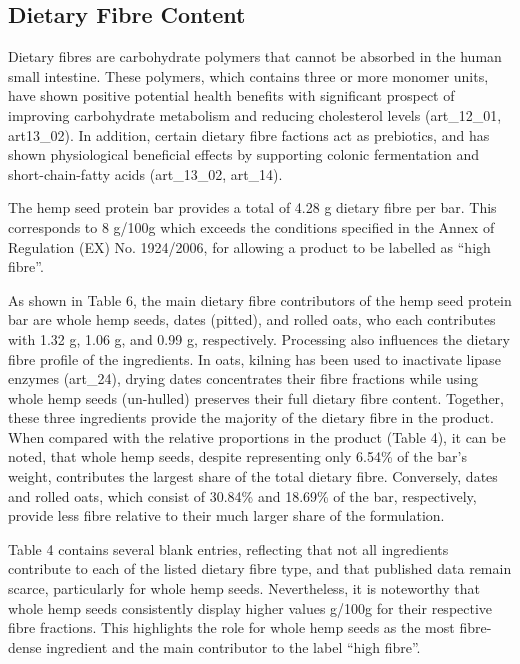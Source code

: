     
\subsection{Dietary Fibre Content} 
Dietary fibres are carbohydrate polymers that cannot be absorbed in the human small intestine. These polymers, which contains three or more monomer units, have shown positive potential health benefits with significant prospect of improving carbohydrate metabolism and reducing cholesterol levels (art\_12\_01, art13\_02). In addition, certain dietary fibre factions act as prebiotics, and has shown physiological beneficial effects by supporting colonic fermentation and short-chain-fatty acids (art\_13\_02, art\_14). 

\vspace{1em}
The hemp seed protein bar provides a total of 4.28 g dietary fibre per bar. This corresponds to 8 g/100g which exceeds the conditions specified in the Annex of Regulation (EX) No. 1924/2006, for allowing a product to be labelled as “high fibre”.

\vspace{1em}
As shown in Table 6, the main dietary fibre contributors of the hemp seed protein bar are whole hemp seeds, dates (pitted), and rolled oats, who each contributes with 1.32 g, 1.06 g, and 0.99 g, respectively. Processing also influences the dietary fibre profile of the ingredients. In oats, kilning has been used to inactivate lipase enzymes (art\_24), drying dates concentrates their fibre fractions while using whole hemp seeds (un-hulled) preserves their full dietary fibre content. Together, these three ingredients provide the majority of the dietary fibre in the product. When compared with the relative proportions in the product (Table 4), it can be noted, that whole hemp seeds, despite representing only 6.54\% of the bar’s weight, contributes the largest share of the total dietary fibre. Conversely, dates and rolled oats, which consist of 30.84\% and 18.69\% of the bar, respectively, provide less fibre relative to their much larger share of the formulation.

\vspace{1em}
Table 4 contains several blank entries, reflecting that not all ingredients contribute to each of the listed dietary fibre type, and that published data remain scarce, particularly for whole hemp seeds. Nevertheless, it is noteworthy that whole hemp seeds consistently display higher values g/100g for their respective fibre fractions. This highlights the role for whole hemp seeds as the most fibre-dense ingredient and the main contributor to the label “high fibre”. 

